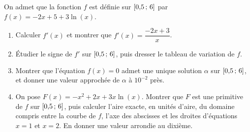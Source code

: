 \begin{annales}
On admet que la fonction $f$ est définie sur $\left[0{,}5\,;\,6\right]$ par
$f(x) = -2x+5+3\ln(x)$.
\begin{enumerate}[label=\textbf{\alph*)}, leftmargin=*, itemsep=0.15em]
  \item Calculer $f'(x)$ et montrer que $f'(x) = \dfrac{-2x+3}{x}$.
  \item Étudier le signe de $f'$ sur $\left[0{,}5\,;\,6\right]$, puis dresser le
        tableau de variation de $f$.
  \item Montrer que l'équation $f(x) = 0$ admet une unique solution $\alpha$
        sur $\left[0{,}5\,;\,6\right]$, et donner une valeur approchée de
        $\alpha$ à $10^{-2}$ près.
  \item On pose $F(x) = -x^{2}+2x+3x\ln(x)$. Montrer que $F$ est une
        primitive de $f$ sur $\left[0{,}5\,;\,6\right]$, puis calculer l'aire
        exacte, en unités d'aire, du domaine compris entre la courbe de $f$,
        l'axe des abscisses et les droites d'équations $x = 1$ et $x = 2$.
        En donner une valeur arrondie au dixième.
\end{enumerate}
\end{annales}

